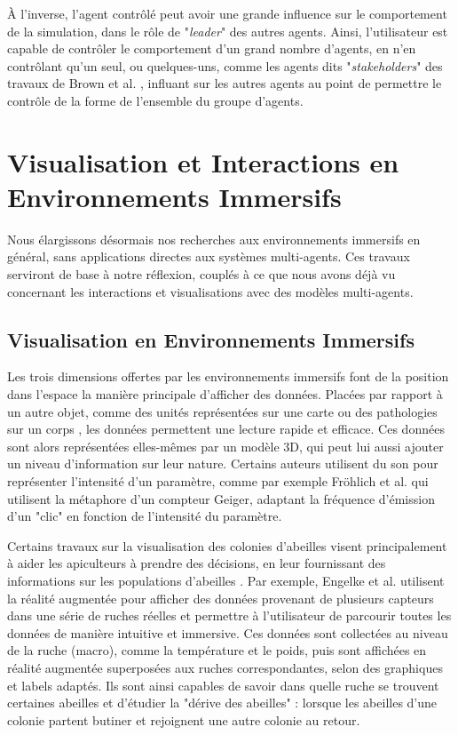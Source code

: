 		À l'inverse, l'agent contrôlé peut avoir une grande influence sur le comportement de la simulation, dans le rôle de "\textit{leader}" des autres agents. Ainsi, l'utilisateur est capable de contrôler le comportement d'un grand nombre d'agents, en n'en contrôlant qu'un seul, ou quelques-uns, comme les agents dits "\textit{stakeholders}" des travaux de Brown et al. \cite{brown_human-swarm_2014}, influant sur les autres agents au point de permettre le contrôle de la forme de l'ensemble du groupe d'agents.
	
	
	\section{Visualisation et Interactions en Environnements Immersifs}	
	
	Nous élargissons désormais nos recherches aux environnements immersifs en général, sans applications directes aux systèmes multi-agents. Ces travaux serviront de base à notre réflexion, couplés à ce que nous avons déjà vu concernant les interactions et visualisations avec des modèles multi-agents.
	
	\subsection{Visualisation en Environnements Immersifs}
	
	Les trois dimensions offertes par les environnements immersifs font de la position dans l'espace la manière principale d'afficher des données. Placées par rapport à un autre objet, comme des unités représentées sur une carte \cite{durbin_battlefield_1998} ou des pathologies sur un corps \cite{coffey_interactive_2011}, les données permettent une lecture rapide et efficace. Ces données sont alors représentées elles-mêmes par un modèle 3D, qui peut lui aussi ajouter un niveau d'information sur leur nature. Certains auteurs utilisent du son pour représenter l'intensité d'un paramètre, comme par exemple Fröhlich et al. \cite{frohlich_exploring_1999} qui utilisent la métaphore d'un compteur Geiger, adaptant la fréquence d'émission d'un "clic" en fonction de l'intensité du paramètre.
	
	
		
		Certains travaux sur la visualisation des colonies d'abeilles visent principalement à aider les apiculteurs à prendre des décisions, en leur fournissant des informations sur les populations d'abeilles \cite{engelke_visual_2016, engelke_melissar_2016, nguyen_augmented_2017}. Par exemple, Engelke et al. \cite{engelke_visual_2016} utilisent la réalité augmentée pour afficher des données provenant de plusieurs capteurs dans une série de ruches réelles et permettre à l'utilisateur de parcourir toutes les données de manière intuitive et immersive. Ces données sont collectées au niveau de la ruche (macro), comme la température et le poids, puis sont affichées en réalité augmentée superposées aux ruches correspondantes, selon des graphiques et labels adaptés. Ils sont ainsi capables de savoir dans quelle ruche se trouvent certaines abeilles et d'étudier la "dérive des abeilles" : lorsque les abeilles d'une colonie partent butiner et rejoignent une autre colonie au retour.
	
